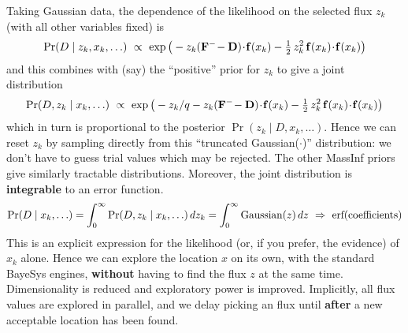 Taking Gaussian data, the dependence of the likelihood on the selected flux $z_k$ (with all other variables fixed) is
$$
    \Pr(D\mid z_k, x_k, \ldots)\ \propto\
    \exp\big(-z_k ({\bf F}^-\! - {\bf D})\!\cdot\! {\bf f}(x_k) - \hbox{$1 \over 2$}\,z_k^2\,{\bf f}(x_k)\!\cdot\! {\bf f}(x_k)\big)
$$
and this combines with (say) the ``positive'' prior for $z_k$ to give a joint distribution
$$
    \Pr(D,z_k\mid x_k, \ldots)\ \propto\
    \exp\big( - z_k/q - z_k ({\bf F}^-\! - {\bf D})\!\cdot\! {\bf f}(x_k) - \hbox{$1 \over 2$}\,z_k^2\,{\bf f}(x_k)\!\cdot\! {\bf f}(x_k) \big)
$$
which in turn is proportional to the posterior $\Pr(z_k\mid D,x_k,\ldots)$.
Hence we can reset $z_k$ by sampling directly from this ``truncated Gaussian($\cdot$)'' distribution: we don't have to guess trial values which may be rejected.
The other MassInf priors give similarly tractable distributions.
Moreover, the joint distribution is {\bf integrable} to an error function.
$$
    \Pr(D\mid x_k, \ldots) = \int_0^\infty \Pr(D,z_k\mid x_k, \ldots)\,dz_k = \int_0^\infty {\rm Gaussian}(z)\,dz \ \Rightarrow\ \hbox{erf(coefficients)}
$$
This is an explicit expression for the likelihood (or, if you prefer, the evidence) of $x_k$ alone.
Hence we can explore the location $x$ on its own, with the standard BayeSys engines, {\bf without} having to find the flux $z$ at the same time.
Dimensionality is reduced and exploratory power is improved.
Implicitly, all flux values are explored in parallel, and we delay picking an flux until {\bf after} a new acceptable location has been found.

